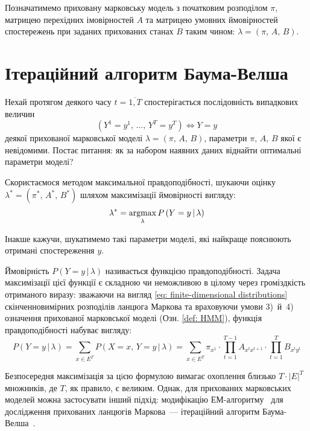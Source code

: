 Позначатимемо приховану марковську модель з початковим розподілом $\pi$, матрицею перехідних імовірностей $A$ та матрицею умовних ймовірностей спостережень при заданих прихованих станах $B$ таким чином: $\lambda=(\pi,\,A,\,B)$.

\section{Ітераційний алгоритм Баума-Велша}

Нехай протягом деякого часу $t=\overline{1,T}$ спостерігається послідовність випадкових величин 
\begin{equation*}
    \left( Y^1=y^1,\,\ldots,\,Y^T=y^T \right) \Longleftrightarrow Y=y
\end{equation*}
деякої прихованої марковської моделі $\lambda=(\pi,\,A,\,B)$, параметри $\pi,\,A,\,B$ якої є невідомими. Постає питання: як за набором наявних даних віднайти оптимальні параметри моделі?

Скористаємося методом максимальної правдоподібності, шукаючи оцінку $\lambda^*=(\pi^*,\,A^*,\,B^*)$ шляхом максимізації ймовірності вигляду:
\begin{equation}\label{eq: likelihood function}
    \lambda^{*}=\operatorname*{argmax}\limits_{\lambda} P\left( Y=y \,|\, \lambda \right)
\end{equation}

Інакше кажучи, шукатимемо такі параметри моделі, які найкраще пояснюють отримані спостереження $y$. 

Ймовірність $P\left( Y=y \,|\, \lambda \right)$ називається функцією правдоподібності. Задача максимізації цієї функції є складною чи неможливою в цілому через громіздкість отриманого виразу: зважаючи на вигляд \eqref{eq: finite-dimensional distributions} скінченновимірних розподілів ланцюга Маркова та враховуючи умови 3)~й~4) означення прихованої марковської моделі (Озн. \ref{def: HMM}), функція правдоподібності набуває вигляду:
\begin{equation*}
    P\left( Y=y \,|\, \lambda \right) = \sum\limits_{x \in E^T} P\left( X=x,\, Y=y \,|\, \lambda \right) = \sum\limits_{x \in E^T} \pi_{x^1} \cdot \prod\limits_{t=1}^{T-1} A_{x^t x^{t+1}} \cdot \prod\limits_{t=1}^{T} B_{x^ty^t} 
\end{equation*}

Безпосередня максимізація за цiєю формулою вимагає охоплення близько $T\cdot|E|^T$ множників, де $T$, як правило, є великим. Однак, для прихованих марковських моделей можна застосувати інший підхід: модифікацію ЕМ-алгоритму~\cite[розділ 4]{Koski2001} для дослідження прихованих ланцюгів Маркова~--- ітераційний алгоритм Баума-Велша~\cite[розділ 15]{Koski2001}. 

